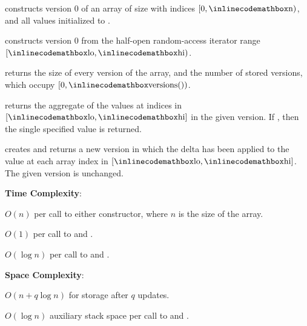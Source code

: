 \begin{compactitem}
  \item {} constructs version $0$ of an array of size  with indices $[0, {\inlinecodemath{n}})$, and all values initialized to .
  \item {} constructs version $0$ from the half-open random-access iterator range $[{\inlinecodemath{lo}}, {\inlinecodemath{hi}})$.
  \item {} returns the size of every version of the array, and  the number of stored versions, which occupy $[0, {\inlinecodemath{versions()}})$.
  \item {} returns the aggregate of the values at indices in $[{\inlinecodemath{lo}}, {\inlinecodemath{hi}}]$ in the given version. If , then the single specified value is returned.
  \item {} creates and returns a new version in which the delta  has been applied to the value at each array index in $[{\inlinecodemath{lo}}, {\inlinecodemath{hi}}]$. The given version is unchanged.
\end{compactitem}

\textbf{Time Complexity}:
\begin{compactitem}
  \item $O(n)$ per call to either constructor, where $n$ is the size of the array.
  \item $O(1)$ per call to  and .
  \item $O(\log n)$ per call to  and .
\end{compactitem}

\textbf{Space Complexity}:
\begin{compactitem}
  \item $O(n + q \log n)$ for storage after $q$ updates.
  \item $O(\log n)$ auxiliary stack space per call to  and .
\end{compactitem}

